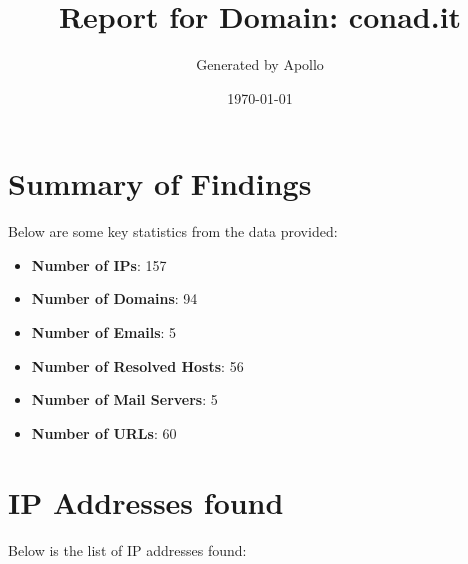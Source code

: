 \documentclass{article}
\title{Report for Domain: conad.it}
\author{Generated by Apollo}
\date{\today}
\begin{document}
\maketitle
\clearpage

\tableofcontents  %

\clearpage

\section{Summary of Findings}

Below are some key statistics from the data provided:

\begin{itemize}
    \item \textbf{Number of IPs}: 157
    \item \textbf{Number of Domains}: 94
    \item \textbf{Number of Emails}: 5
    \item \textbf{Number of Resolved Hosts}: 56
    \item \textbf{Number of Mail Servers}: 5
    \item \textbf{Number of URLs}: 60
\end{itemize}

\clearpage

\section{IP Addresses found}

Below is the list of IP addresses found:
\end{document}

